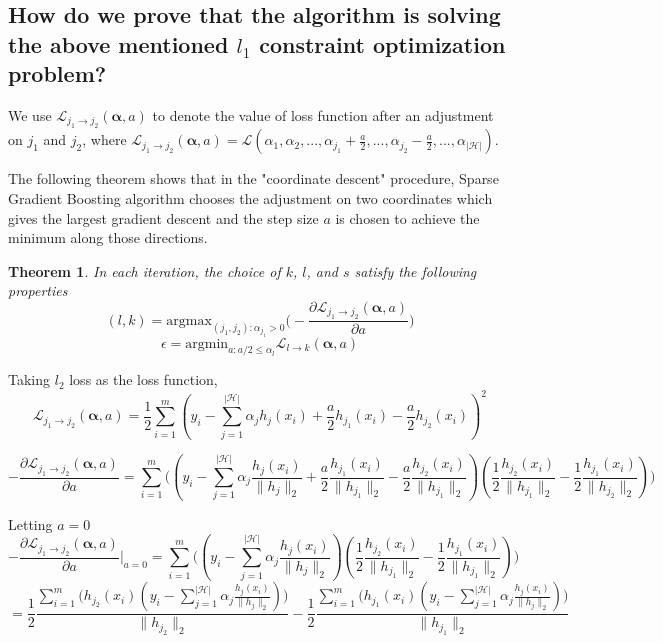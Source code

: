 \documentclass{article} %
\newtheorem{theorem}{Theorem}
\begin{document}
\subsection{ How do we prove that the algorithm is solving the above mentioned $l_1$ constraint optimization problem?}
We use $\mathcal{L}_{j_1\rightarrow j_2}(\boldsymbol\alpha,a)$ to denote the value of loss function after an adjustment on $j_1$ and $j_2$, where
$ \mathcal{L}_{j_1\rightarrow j_2}(\boldsymbol\alpha,a) = \mathcal{L}(\alpha_1, \alpha_2,..., \alpha_{j_1}+\frac{a}{2},..., \alpha_{j_2}-\frac{a}{2},...,\alpha_{\mathcal{|H|}})$.


The following theorem shows that in the "coordinate descent" procedure, Sparse Gradient Boosting  algorithm chooses the adjustment on two coordinates which gives the largest gradient descent and the step size $a$ is chosen to achieve the minimum along those directions.




\begin{theorem}
In each iteration, the choice of $k$, $l$, and $s$ satisfy the following properties
\[ (l,k)=\text{argmax}_{(j_1,j_2):\alpha_{j_1}>0} \bigg( - \frac{\partial \mathcal{L}_{j_1\rightarrow j_2}(\boldsymbol\alpha,a)}{\partial a} \bigg) \]
\[ \epsilon = \text{argmin}_{a:a/2\leq \alpha_l} \mathcal{L}_{l \rightarrow k}(\boldsymbol\alpha,a)\]
\end{theorem}  %
Taking $l_2$ loss as the loss function, $$\mathcal{L}_{j_{1}\rightarrow j_{2}}(\mathbf{\alpha},a)=  \frac{1}{2} \sum_{i=1}^{m}(y_{i}-\sum_{j=1}^{|\mathcal{H}|}\alpha_{j}h_{j}(x_{i})+ \frac{a}{2}h_{j_1}(x_i)-\frac{a}{2}h_{j_2}(x_i))^2$$

\[-\frac{\partial\mathcal{L}_{j_{1}\rightarrow j_{2}}(\mathbf{\alpha},a)}{\partial a} =\sum_{i=1}^{m}\bigg((y_{i}-\sum_{j=1}^{|\mathcal{H}|}\alpha_{j} \frac{h_{j}(x_{i})} {\|h_j\|_2}+\frac{a}{2} \frac{h_{j_{1}}(x_{i})} {\| h_{j_1}\|_2}-\frac{a}{2}\frac{h_{j_{2}}(x_{i})} {\| h_{j_1}\|_2} )(\frac{1}{2} \frac{h_{j_{2}}(x_{i})} {\| h_{j_1}\|_2}-\frac{1}{2} \frac{h_{j_{1}}(x_{i})} {\| h_{j_2}\|_2})\bigg)\]

Letting $a=0$
\[-\frac{\partial\mathcal{L}_{j_{1}\rightarrow j_{2}}(\mathbf{\alpha},a)}{\partial a} \bigg|_{a=0}=  \sum_{i=1}^{m}\bigg((y_{i}-\sum_{j=1}^{|\mathcal{H}|}\alpha_{j} \frac{ h_{j}(x_{i}) } {\| h_{j}\|_2})(\frac{1}{2} \frac{h_{j_{2}}(x_{i})} {\| h_{j_1}\|_2}-\frac{1}{2} \frac{h_{j_{1}}(x_{i})}  {\| h_{j_1}\|_2})\bigg)\]
\[=\frac{1}{2}  \frac{\sum_{i=1}^{m}\bigg(h_{j_{2}}(x_{i})(y_{i}-\sum_{j=1}^{|\mathcal{H}|}\alpha_{j} \frac{h_{j}(x_{i})}  {\| h_{j}\|_2} )\bigg) }  {\| h_{j_2}\|_2}  -  \frac{1}{2}  \frac{\sum_{i=1}^{m}\bigg(h_{j_{1}}(x_{i})(y_{i}-\sum_{j=1}^{|\mathcal{H}|}\alpha_{j} \frac{h_{j}(x_{i})}  {\| h_{j}\|_2} )\bigg) }  {\| h_{j_1}\|_2}   \]
\end{document}

